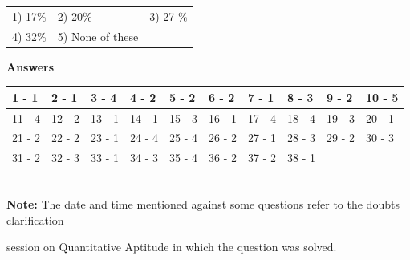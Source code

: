 \documentclass{article}
\begin{document}
	\noindent 
	
	\noindent \begin{tabular}{p{1.7in} p{1.6in} p{1.6in}} \\ 
 1) 17\%                    & 2) 20\%              & 3) 27 \%             \\
4) 32\%              & 5) None of these \\
\end{tabular}
	
	\noindent 
	
	\noindent 
	\newpage
	\noindent   \textbf{Answers \\ }
	
	\noindent 
	
	\noindent  
	
	\begin{tabular}{|p{0.7in}|p{0.5in}|p{0.4in}|p{0.5in}|p{0.5in}|p{0.4in}|p{0.5in}|p{0.4in}|p{0.5in}|p{0.4in}|} \hline 
		1 - 1 & 2 - 1 & 3 - 4 & 4 - 2 & 5 - 2 & 6 - 2 & 7 - 1 & 8 - 3 & 9 - 2 & 10 - 5 \\ \hline 
		11 - 4 & 12 - 2 & 13 - 1 & 14 - 1 & 15 - 3 & 16 - 1 & 17 - 4 & 18 - 4 & 19 - 3 & 20 - 1 \\ \hline 
		21 - 2 & 22 - 2 & 23 - 1 & 24 - 4 & 25 - 4 & 26 - 2 & 27 - 1 & 28 - 3 & 29 - 2 & 30 - 3 \\ \hline 
		31 - 2 & 32 - 3 & 33 - 1 & 34 - 3 & 35 - 4 & 36 - 2 & 37 - 2 & 38 - 1 &  &  \\ \hline 
	\end{tabular}
	
	
	
	\noindent 
	
	\noindent  \\ 
	
	\noindent \textbf{Note: }The date and time mentioned against some questions refer to the doubts clarification
	
	\noindent session on Quantitative Aptitude in which the question was solved.
\end{document}
